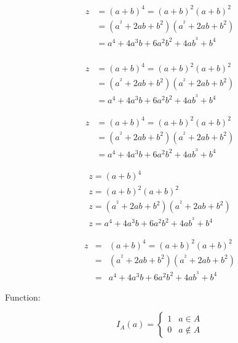 \documentclass{book} %
\begin{document}
\begin{equation}
\begin{split}
z &= {\left( {a + b} \right)^4} = {\left( {a + b} \right)^2}{\left( {a + b} \right)^2}\\
  &= \left( {{a^{^2}} + 2ab + {b^2}} \right)\left( {{a^{^2}} + 2ab + {b^2}} \right)\\
   &= {a^4} + 4{a^3}b + 6{a^2}{b^2} + 4a{b^{^3}} + {b^4}\\
\end{split}
\end{equation}

\begin{align}
	z &= {\left( {a + b} \right)^4} = {\left( {a + b} \right)^2}{\left( {a + b} \right)^2}\\
	&= \left( {{a^{^2}} + 2ab + {b^2}} \right)\left( {{a^{^2}} + 2ab + {b^2}} \right)\\
	&= {a^4} + 4{a^3}b + 6{a^2}{b^2} + 4a{b^{^3}} + {b^4}
\end{align}

\begin{align}
z &= {\left( {a + b} \right)^4} = {\left( {a + b} \right)^2}{\left( {a + b} \right)^2}\nonumber\\
&= \left( {{a^{^2}} + 2ab + {b^2}} \right)\left( {{a^{^2}} + 2ab + {b^2}} \right)\\
&= {a^4} + 4{a^3}b + 6{a^2}{b^2} + 4a{b^{^3}} + {b^4}
\end{align}

\begin{equation}
\begin{gathered}
z = {\left( {a + b} \right)^4}\\ 
z = {\left( {a + b} \right)^2}{\left( {a + b} \right)^2}\\
z = \left( {{a^{^2}} + 2ab + {b^2}} \right)\left( {{a^{^2}} + 2ab + {b^2}} \right)\\
z = {a^4} + 4{a^3}b + 6{a^2}{b^2} + 4a{b^{^3}} + {b^4}
\end{gathered}
\end{equation}

\begin{eqnarray}
z &=& {\left( {a + b} \right)^4} = {\left( {a + b} \right)^2}{\left( {a + b} \right)^2}\nonumber\\
&=& \left( {{a^{^2}} + 2ab + {b^2}} \right)\left( {{a^{^2}} + 2ab + {b^2}} \right)\\
&=& {a^4} + 4{a^3}b + 6{a^2}{b^2} + 4a{b^{^3}} + {b^4}
\end{eqnarray}

Function:

$$I_A(a)=\begin{cases}
	1&a\in A\\
	0&a\not\in A
\end{cases}$$
\end{document}

